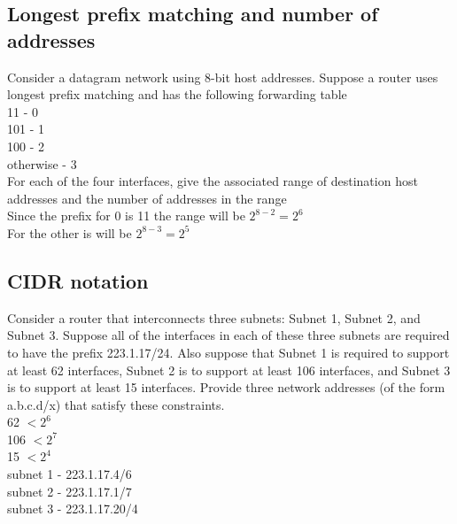 \documentclass[12pt, a4paper]{article}
\begin{document}
		\subsection{Longest prefix matching and number of addresses}
			Consider a datagram network using 8-bit host addresses. Suppose a router uses longest prefix matching and has the following forwarding table\\
			11 - 0\\
			101 - 1\\
			100 - 2\\
			otherwise - 3\\
			For each of the four interfaces, give the associated range of destination host addresses and the number of addresses in the range\\
			Since the prefix for 0 is 11 the range will be $2^{8-2}=2^6$\\
			For the other is will be $2^{8-3}=2^5$
		\subsection{CIDR notation}
			Consider a router that interconnects three subnets: Subnet 1, Subnet 2, and Subnet 3. Suppose all of the interfaces in each of these three subnets are required to have the prefix 223.1.17/24. Also suppose that Subnet 1 is required to support at least 62 interfaces, Subnet 2 is to support at least 106 interfaces, and Subnet 3 is to support at least 15 interfaces. Provide three network addresses (of the form a.b.c.d/x) that satisfy these constraints.\\
			62 $< 2^6$\\
			106 $< 2^7$\\
			15 $< 2^4$\\
			subnet 1 - 223.1.17.4/6\\
			subnet 2 - 223.1.17.1/7\\
			subnet 3 - 223.1.17.20/4
\end{document}
